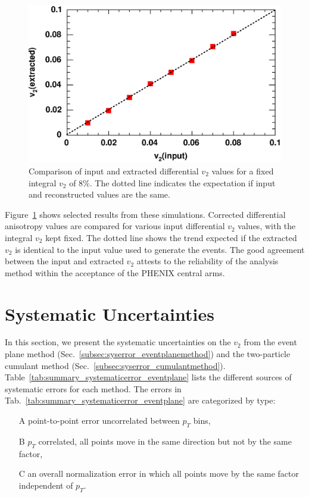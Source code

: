 \documentclass[aps,prc,superscriptaddress,showpacs,floatfix,twocolumn]{revtex4}
\newcommand \pt{\mbox{$p_T$}\xspace}
\begin{document}
\begin{figure}[hbt]
\includegraphics[width=1.0\linewidth]{./v2outvsv2in.eps}
\caption{\label{v2outvsv2in}
Comparison of input and extracted differential $v_{2}$ values for a fixed 
integral $v_{2}$ of 8$\%$. The dotted line indicates the expectation if 
input and reconstructed values are the same.}
\end{figure}

Figure~\ref{v2outvsv2in} shows selected results from these 
simulations.  Corrected differential anisotropy values are 
compared for various input differential $v_2$ values, with the 
integral $v_2$ kept fixed. The dotted line shows the trend 
expected if the extracted $v_2$ is identical to the input value 
used to generate the events. The good agreement between the 
input and extracted $v_2$ attests to the reliability of the 
analysis method within the acceptance of the PHENIX central 
arms.

\section{Systematic Uncertainties\label{sec:systematic_uncertainties}}

In this section, we present the systematic uncertainties on the $v_2$ from the event plane method 
(Sec.~\ref{subsec:syserror_eventplanemethod}) and the two-particle cumulant method 
(Sec.~\ref{subsec:syserror_cumulantmethod}). 
Table~\ref{tab:summary_systematicerror_eventplane} lists
the different sources of systematic errors for each method.
The errors in Tab.~\ref{tab:summary_systematicerror_eventplane}
are categorized by type:
  \begin{itemize}
    \item[A] point-to-point error uncorrelated between \pt bins,
    \item[B] \pt correlated, all points move in the same direction
but not by the same factor,
    \item[C] an overall normalization error in which all points
move by the same factor independent of \pt.
  \end{itemize}
\end{document}
